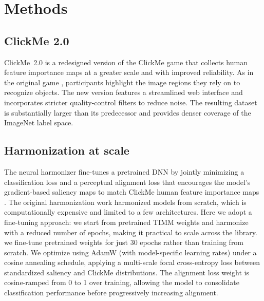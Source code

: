 \documentclass[submission]{ccn}
\begin{document}
\section{Methods}
\subsection{ClickMe 2.0}
ClickMe~2.0 is a redesigned version of the ClickMe game that collects human feature importance maps at a greater scale and with improved reliability. As in the original game \citep{LinsleyEberhardtSharmaSerre2017, LinsleySchiebler2019}, participants highlight the image regions they rely on to recognize objects. The new version features a streamlined web interface and incorporates stricter quality-control filters to reduce noise. The resulting dataset is substantially larger than its predecessor and provides denser coverage of the ImageNet label space.

\subsection{Harmonization at scale}
The neural harmonizer fine-tunes a pretrained DNN by jointly minimizing a classification loss and a perceptual alignment loss that encourages the model's gradient-based saliency maps to match ClickMe human feature importance maps \citep{FelRodriguezLinsleySerre2022}. The original harmonization work harmonized models from scratch, which is computationally expensive and limited to a few architectures. Here we adopt a fine-tuning approach: we start from pretrained TIMM weights and harmonize with a reduced number of epochs, making it practical to scale across the library. we fine-tune pretrained weights for just 30 epochs rather than training from scratch. We optimize using AdamW (with model-specific learning rates) under a cosine annealing schedule, applying a multi-scale focal cross-entropy loss between standardized saliency and ClickMe distributions. The alignment loss weight is cosine-ramped from 0 to 1 over training, allowing the model to consolidate classification performance before progressively increasing alignment.
\end{document}
